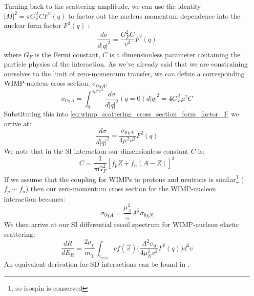 \par
Turning back to the scattering amplitude, we can use the identity $|M|^2=\pi G^2_F C F^2(q)$ to factor out the nucleus momentum dependence into the nuclear form factor $F^2(q)$ \cite{introduction_to_elementary_particles_ref}:
\begin{equation}
    \frac{d\sigma}{d|q|^2} = \frac{G^2_F C}{v^2} F^2(q)
    \label{eq:wimp_scattering_cross_section_form_factor_1}
\end{equation}
where $G_F$ is the Fermi constant, $C$ is a dimensionless parameter containing the particle physics of the interaction.
As we've already said that we are constraining ourselves to the limit of zero-momentum transfer, we can define a corresponding WIMP-nucleus cross section, $\sigma_{0 \chi A}$:
\begin{equation}
    \sigma_{0 \chi A} = \int^{4\mu^2 v^2}_{0} \frac{d\sigma}{d|q|^2}(q=0) d|q|^2 = 4G^2_F \mu^2 C
\end{equation}
Substituting this into \autoref{eq:wimp_scattering_cross_section_form_factor_1} we arrive at:
\begin{equation}
    \frac{d\sigma}{d|q|^2} = \frac{\sigma_{0 \chi A}}{4 \mu^2 v^2} F^2(q)
    \label{eq:wimp_scattering_cross_section_form_factor_2}
\end{equation}
We note that in the SI interaction our dimensionless constant $C$ is:
\begin{equation}
    C = \frac{1}{\pi G^2_F} [f_pZ + f_n (A-Z)]^2
\end{equation}
If we assume that the coupling for WIMPs to protons and neutrons is similar\footnote{so isospin is conserved} ($f_p \backsim f_n$) then our zero-momentum cross section for the WIMP-nucleon interaction becomes:
\begin{equation}
    \sigma_{0 \chi A} = \frac{\mu^2_A}{\pi} A^2 \sigma_{0 \chi N}
\end{equation}
We then arrive at our SI differential recoil spectrum for WIMP-nucleon elastic scattering:
\begin{equation}
    \frac{dR}{dE_R} = \frac{2 \rho_\chi}{m_\chi} \int_{v_{min}} v f(\vec{v}) \bigg(\frac{A^2 \sigma_0}{4 \mu^2_N v^2} F^2(q) \bigg) d^3v
    \label{eq:wimp_si_differential_rate}
\end{equation}
An equivalent derivation for SD interactions can be found in \cite{wimp_theory_ref}.
 
